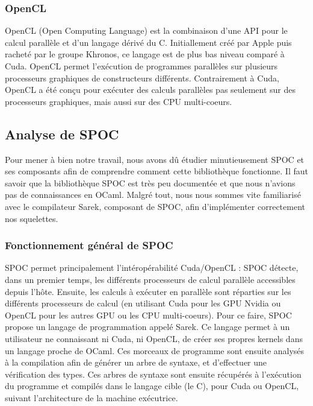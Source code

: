 \documentclass{report}
\begin{document}
\subsubsection{OpenCL}
OpenCL (Open Computing Language) est la combinaison d'une API pour le calcul parallèle et d'un langage dérivé du C. Initiallement créé par Apple puis racheté par le groupe Khronos, ce langage est de plus bas niveau comparé à Cuda. \newline
OpenCL permet l'exécution de programmes parallèles sur plusieurs processeurs graphiques de constructeurs différents. \newline
Contrairement à Cuda, OpenCL a été conçu pour exécuter des calculs parallèles pas seulement sur des processeurs graphiques, mais aussi sur des CPU multi-coeurs. \newline

\subsection{Analyse de SPOC}
Pour mener à bien notre travail, nous avons dû étudier minutieusement SPOC et ses composants afin de comprendre comment cette bibliothèque fonctionne. Il faut savoir que la bibliothèque SPOC est très peu documentée et que nous n'avions pas de connaissances en OCaml.\newline
Malgré tout, nous nous sommes vite familiarisé avec le compilateur Sarek, composant de SPOC, afin d'implémenter correctement nos squelettes. \newline

\subsubsection{Fonctionnement général de SPOC}
SPOC permet principalement l'intéropérabilité Cuda/OpenCL :\newline
SPOC détecte, dans un premier temps, les différents processeurs de calcul parallèle accessibles depuis l'hôte.\newline
Ensuite, les calculs à exécuter en parallèle sont réparties sur les différents processeurs de calcul (en utilisant Cuda pour les GPU Nvidia ou OpenCL pour les autres GPU ou les CPU multi-coeurs). \newline
Pour ce faire, SPOC propose un langage de programmation appelé Sarek. Ce langage permet à un utilisateur ne connaissant ni Cuda, ni OpenCL, de créer ses propres kernels dans un langage proche de OCaml. Ces morceaux de programme sont ensuite analysés à la compilation afin de générer un arbre de syntaxe, et d'effectuer une vérification des types.\newline
Ces arbres de syntaxe sont ensuite récupérés à l'exécution du programme et compilés dans le langage cible (le C), pour Cuda ou OpenCL, suivant l'architecture de la machine exécutrice. \newline
\end{document}
